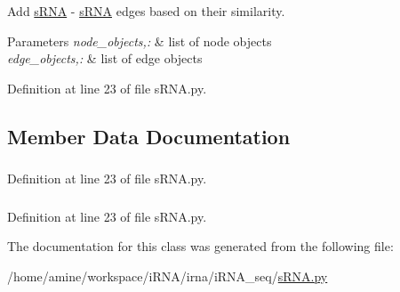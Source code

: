 \-Add \hyperlink{classirna_1_1iRNA__seq_1_1sRNA_1_1sRNA}{s\-R\-N\-A} -\/ \hyperlink{classirna_1_1iRNA__seq_1_1sRNA_1_1sRNA}{s\-R\-N\-A} edges based on their similarity. 


\begin{DoxyParams}{\-Parameters}
{\em node\-\_\-objects,\-:} & list of node objects \\
\hline
{\em edge\-\_\-objects,\-:} & list of edge objects \\
\hline
\end{DoxyParams}


\-Definition at line 23 of file s\-R\-N\-A.\-py.



\subsection{\-Member \-Data \-Documentation}
\hypertarget{classirna_1_1iRNA__seq_1_1sRNA_1_1sRNA_ac9066c984847991718ee10286b952d3c}{
\subsubsection[{s\-R\-N\-A\-\_\-obj}]{}}
\label{classirna_1_1iRNA__seq_1_1sRNA_1_1sRNA_ac9066c984847991718ee10286b952d3c}


\-Definition at line 23 of file s\-R\-N\-A.\-py.

\hypertarget{classirna_1_1iRNA__seq_1_1sRNA_1_1sRNA_a601e0a2600204bf6fe9526cc626c43c7}{
\subsubsection[{srnareg}]{}}
\label{classirna_1_1iRNA__seq_1_1sRNA_1_1sRNA_a601e0a2600204bf6fe9526cc626c43c7}


\-Definition at line 23 of file s\-R\-N\-A.\-py.



\-The documentation for this class was generated from the following file\-:\begin{DoxyCompactItemize}
\item 
/home/amine/workspace/i\-R\-N\-A/irna/i\-R\-N\-A\-\_\-seq/\hyperlink{sRNA_8py}{s\-R\-N\-A.\-py}\end{DoxyCompactItemize}
